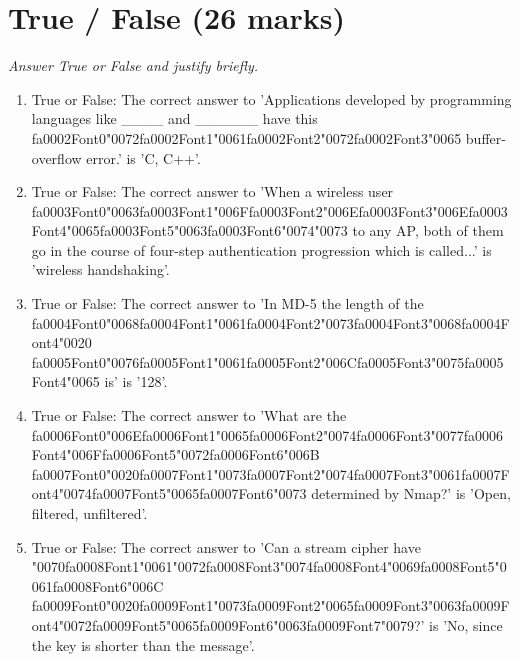 \documentclass[12pt]{article}
\begin{document}
\section*{True / False (26 marks)}
\textit{Answer True or False and justify briefly.}
\begin{enumerate}[label=\arabic*.]
\item True or False: The correct answer to 'Applications developed by programming languages like \_\_\_\_ and \_\_\_\_\_\_ have this {\csname fa0002Font0\endcsname\char"0072}{\csname fa0002Font1\endcsname\char"0061}{\csname fa0002Font2\endcsname\char"0072}{\csname fa0002Font3\endcsname\char"0065} buffer-overflow error.' is 'C, C++'.
\item True or False: The correct answer to 'When a wireless user {\csname fa0003Font0\endcsname\char"0063}{\csname fa0003Font1\endcsname\char"006F}{\csname fa0003Font2\endcsname\char"006E}{\csname fa0003Font3\endcsname\char"006E}{\csname fa0003Font4\endcsname\char"0065}{\csname fa0003Font5\endcsname\char"0063}{\csname fa0003Font6\endcsname\char"0074}{\char"0073} to any AP, both of them go in the course of four-step authentication progression which is called...' is 'wireless handshaking'.
\item True or False: The correct answer to 'In MD-5 the length of the {\csname fa0004Font0\endcsname\char"0068}{\csname fa0004Font1\endcsname\char"0061}{\csname fa0004Font2\endcsname\char"0073}{\csname fa0004Font3\endcsname\char"0068}{\csname fa0004Font4\endcsname\char"0020} {\csname fa0005Font0\endcsname\char"0076}{\csname fa0005Font1\endcsname\char"0061}{\csname fa0005Font2\endcsname\char"006C}{\csname fa0005Font3\endcsname\char"0075}{\csname fa0005Font4\endcsname\char"0065} is' is '128'.
\item True or False: The correct answer to 'What are the {\csname fa0006Font0\endcsname\char"006E}{\csname fa0006Font1\endcsname\char"0065}{\csname fa0006Font2\endcsname\char"0074}{\csname fa0006Font3\endcsname\char"0077}{\csname fa0006Font4\endcsname\char"006F}{\csname fa0006Font5\endcsname\char"0072}{\csname fa0006Font6\endcsname\char"006B} {\csname fa0007Font0\endcsname\char"0020}{\csname fa0007Font1\endcsname\char"0073}{\csname fa0007Font2\endcsname\char"0074}{\csname fa0007Font3\endcsname\char"0061}{\csname fa0007Font4\endcsname\char"0074}{\csname fa0007Font5\endcsname\char"0065}{\csname fa0007Font6\endcsname\char"0073} determined by Nmap?' is 'Open, filtered, unfiltered'.
\item True or False: The correct answer to 'Can a stream cipher have {\char"0070}{\csname fa0008Font1\endcsname\char"0061}{\char"0072}{\csname fa0008Font3\endcsname\char"0074}{\csname fa0008Font4\endcsname\char"0069}{\csname fa0008Font5\endcsname\char"0061}{\csname fa0008Font6\endcsname\char"006C} {\csname fa0009Font0\endcsname\char"0020}{\csname fa0009Font1\endcsname\char"0073}{\csname fa0009Font2\endcsname\char"0065}{\csname fa0009Font3\endcsname\char"0063}{\csname fa0009Font4\endcsname\char"0072}{\csname fa0009Font5\endcsname\char"0065}{\csname fa0009Font6\endcsname\char"0063}{\csname fa0009Font7\endcsname\char"0079}?' is 'No, since the key is shorter than the message'.

\end{enumerate}
\end{document}
